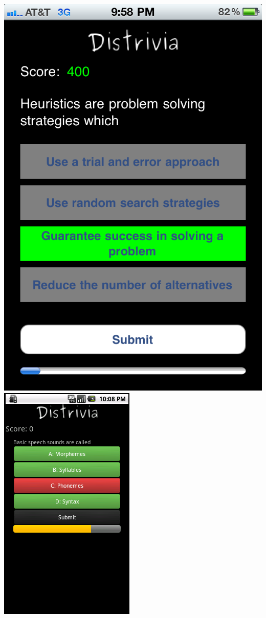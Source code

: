 \documentclass[landscape,a0paper,final,showframe]{baposter}
\begin{document}
\begin{poster}
{\begin{multicols}{3}
\includegraphics[scale=0.22]{../papers/phase-three/iPhone_round.png} \\
\includegraphics[scale=0.52]{../papers/phase-three/android/answer2.png} \\

\end{multicols}}
\end{poster}
\end{document}
